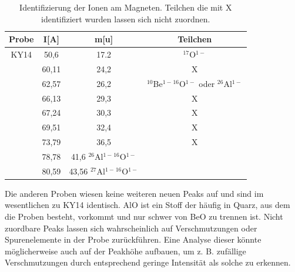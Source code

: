 \begin{table}[h]
\centering
\caption{Identifizierung der Ionen am Magneten. Teilchen die mit X identifiziert wurden lassen sich nicht zuordnen.}
\begin{tabular}{|c| c |c|c|}
\hline
Probe & I[A] & m[u] & Teilchen \\
\hline
KY14    & 50,6    & 17.2 & $^{17}$O$^{1-}$ \\
 	& 60,11 & 24,2 & X\\
	& 62,57 & 26,2 & $^{10}$Be$^{1-}$$^{16}$O$^{1-}$ oder  $^{26}$Al$^{1-}$ \\
	& 66,13 & 29,3 & X\\
	& 67,24 & 30,3 & X\\
	& 69,51 & 32,4 & X\\
	& 73,79 & 36,5 & X\\
	& 78,78 & 41,6 $^{26}$Al$^{1-}$$^{16}$O$^{1-}$\\
	& 80,59 &43,56 $^{27}$Al$^{1-}$$^{16}$O$^{1-}$\\
\end{tabular}
\label{KY}
\end{table}
Die anderen Proben wiesen keine weiteren neuen Peaks auf und sind im wesentlichen zu KY14 identisch.
AlO ist ein Stoff der häufig in Quarz, aus dem die Proben besteht, vorkommt und nur schwer von BeO zu trennen ist.
Nicht zuordbare Peaks lassen sich wahrscheinlich auf Verschmutzungen oder Spurenelemente in der Probe zurückführen.
Eine Analyse dieser könnte möglicherweise auch auf der Peakhöhe aufbauen, um z. B. zufällige Verschmutzungen durch entsprechend geringe Intensität als solche zu erkennen.

